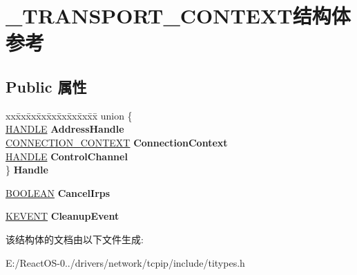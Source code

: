 \hypertarget{struct___t_r_a_n_s_p_o_r_t___c_o_n_t_e_x_t}{}\section{\+\_\+\+T\+R\+A\+N\+S\+P\+O\+R\+T\+\_\+\+C\+O\+N\+T\+E\+X\+T结构体 参考}
\label{struct___t_r_a_n_s_p_o_r_t___c_o_n_t_e_x_t}
\subsection*{Public 属性}
\begin{DoxyCompactItemize}
\item 
\mbox{\label{struct___t_r_a_n_s_p_o_r_t___c_o_n_t_e_x_t_a0c1ff8e2d385a7221d83dbe6b2c27aef}} 
\begin{tabbing}
xx\=xx\=xx\=xx\=xx\=xx\=xx\=xx\=xx\=\kill
union \{\\
\>\hyperlink{interfacevoid}{HANDLE} {\bfseries AddressHandle}\\
\>\hyperlink{interfacevoid}{CONNECTION\_CONTEXT} {\bfseries ConnectionContext}\\
\>\hyperlink{interfacevoid}{HANDLE} {\bfseries ControlChannel}\\
\} {\bfseries Handle}\\

\end{tabbing}\item 
\mbox{\label{struct___t_r_a_n_s_p_o_r_t___c_o_n_t_e_x_t_a9edb704c4bfed6f559db9f58bb4f9bef}} 
\hyperlink{_processor_bind_8h_a112e3146cb38b6ee95e64d85842e380a}{B\+O\+O\+L\+E\+AN} {\bfseries Cancel\+Irps}
\item 
\mbox{\label{struct___t_r_a_n_s_p_o_r_t___c_o_n_t_e_x_t_a5a42619548b91d35f709df75ecc89ddb}} 
\hyperlink{struct___k_e_v_e_n_t}{K\+E\+V\+E\+NT} {\bfseries Cleanup\+Event}
\end{DoxyCompactItemize}


该结构体的文档由以下文件生成\+:\begin{DoxyCompactItemize}
\item 
E\+:/\+React\+O\+S-\/0../drivers/network/tcpip/include/titypes.\+h\end{DoxyCompactItemize}
